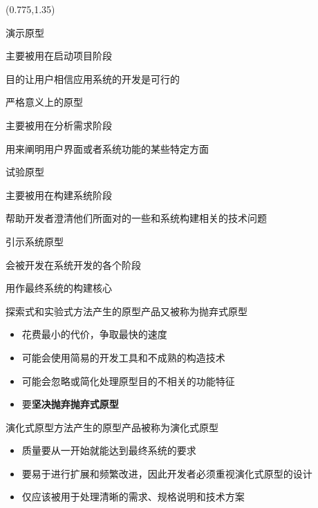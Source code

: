 \begin{textblock}{0.5}(0.775,1.35)
{\fangsong
\begin{compactitem}
    \item 演示原型
    \begin{compactitem}
        \item 主要被用在启动项目阶段 
        \item 目的让用户相信应用系统的开发是可行的 
    \end{compactitem}
    \item 严格意义上的原型
    \begin{compactitem}
        \item 主要被用在分析需求阶段 
        \item 用来阐明用户界面或者系统功能的某些特定方面 
    \end{compactitem}
    \item 试验原型
    \begin{compactitem}
        \item 主要被用在构建系统阶段 
        \item 帮助开发者澄清他们所面对的一些和系统构建相关的技术问题 
    \end{compactitem}
    \item  引示系统原型
    \begin{compactitem}
        \item 会被开发在系统开发的各个阶段 
        \item 用作最终系统的构建核心 
    \end{compactitem}
\end{compactitem}}
\end{textblock}

  
探索式和实验式方法产生的原型产品又被称为抛弃式原型 
\begin{itemize}
    \item 花费最小的代价，争取最快的速度 
    \item 可能会使用简易的开发工具和不成熟的构造技术 
    \item 可能会忽略或简化处理原型目的不相关的功能特征 
    \item 要\textbf{坚决抛弃抛弃式原型}
\end{itemize}

演化式原型方法产生的原型产品被称为演化式原型
\begin{itemize}
    \item 质量要从一开始就能达到最终系统的要求 
    \item 要易于进行扩展和频繁改进，因此开发者必须重视演化式原型的设计 
    \item 仅应该被用于处理清晰的需求、规格说明和技术方案 
\end{itemize}

